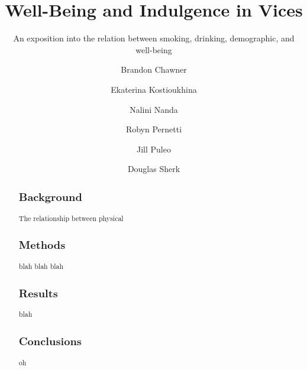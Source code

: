 \documentclass[sigconf]{acmart}
\begin{document}
\title{Well-Being and Indulgence in Vices}
\subtitle{An exposition into the relation between smoking, drinking,
  demographic, and well-being}



\author{Brandon Chawner}

\author{Ekaterina Kostioukhina}

\author{Nalini Nanda}

\author{Robyn Pernetti}

\author{Jill Puleo}

\author{Douglas Sherk}

\renewcommand{\shortauthors}{B. Chawner et al.}

\begin{abstract}
  \subsection{Background}
  The relationship between physical
  \subsection{Methods}
  blah blah blah
  \subsection{Results}
  blah 
  \subsection{Conclusions}
  oh
\end{abstract}
\end{document}

